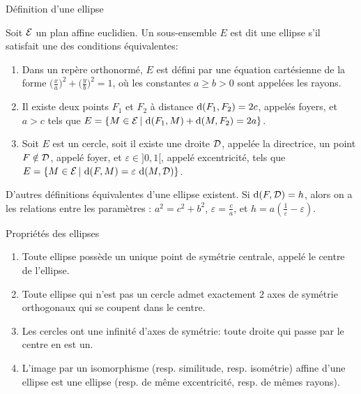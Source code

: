 \documentclass[11pt]{m53beamer}
\begin{document}
\begin{frame}{Définition d'une ellipse}
  \begin{defprop}
    Soit $\mathcal{E}$ un plan affine euclidien. Un sous-ensemble $E$ est dit une \alert{ellipse} s'il satisfait une des conditions équivalentes:
    \begin{enumerate}[<+(1)->]
      \item Dans un repère orthonormé, $E$ est défini par une équation cartésienne de la forme $\big(\frac{x}{a}\big)^{2}+\big(\frac{y}{b}\big)^{2}=1$, où les constantes $a \geq b > 0$ sont appelées \alert{les rayons}.
      \item Il existe deux points $F_{1}$ et $F_{2}$ à distance $\operatorname{d}(F_{1},F_{2})=2c$, appelés \alert{foyers},  et $a > c$ tels que $E = \{ M \in \mathcal{E} \,|\, \operatorname{d}(F_{1},M)+\operatorname{d}(M,F_{2})=2a\}$.
      \item Soit $E$ est un cercle, soit il existe une droite $\mathcal{D}$, appelée \alert{la directrice}, un point $F \notin \mathcal{D}$, appelé \alert{foyer}, et $\varepsilon \in ]0,1[$, appelé \alert{excentricité}, tels que $E = \{ M \in \mathcal{E} \,|\, \operatorname{d}(F,M)=\varepsilon\,\operatorname{d}(M,\mathcal{D})\}$.
    \end{enumerate}
  \end{defprop}\pause
  D'autres définitions équivalentes d'une ellipse existent.\pause{}\newline
  Si $\operatorname{d}(F,\mathcal{D})=h$, alors on a les relations entre les paramètres : $a^{2}=c^{2}+b^{2}$, $\varepsilon =\frac{c}{a}$, et $h=a(\frac{1}{\varepsilon}-\varepsilon)$.
\end{frame}
\begin{frame}{Propriétés des ellipses}
  \begin{enumerate}[<+(1)->]
    \item Toute ellipse possède un unique point de symétrie centrale, appelé \alert{le centre} de l'ellipse.
    \item Toute ellipse qui n'est pas un cercle admet exactement $2$ axes de symétrie orthogonaux qui se coupent dans le centre.
    \item Les cercles ont une infinité d'axes de symétrie: toute droite qui passe par le centre en est un.
    \item L'image par un isomorphisme (resp. similitude, resp. isométrie) affine d'une ellipse est une ellipse (resp. de même excentricité, resp. de mêmes rayons).
  \end{enumerate}
\end{frame}
\end{document}
